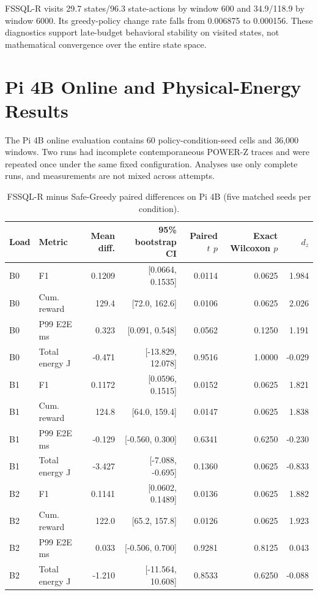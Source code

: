 \documentclass[10pt,journal]{IEEEtran}
\begin{document}
FSSQL-R visits 29.7 states/96.3 state-actions by window 600 and 34.9/118.9 by window 6000. Its greedy-policy change rate falls from 0.006875 to 0.000156. These diagnostics support late-budget behavioral stability on visited states, not mathematical convergence over the entire state space.

\section{Pi 4B Online and Physical-Energy Results}
The Pi 4B online evaluation contains 60 policy-condition-seed cells and 36,000 windows. Two runs had incomplete contemporaneous POWER-Z traces and were repeated once under the same fixed configuration. Analyses use only complete runs, and measurements are not mixed across attempts.

\begin{table}[h]
\caption{FSSQL-R minus Safe-Greedy paired differences on Pi 4B (five matched seeds per condition).}
\centering\scriptsize
\setlength{\tabcolsep}{3pt}
\begin{tabular}{llrrrrr}
\toprule
Load & Metric & Mean diff. & 95\% bootstrap CI & Paired $t$ $p$ & Exact Wilcoxon $p$ & $d_z$ \\
\midrule
B0 & F1 & 0.1209 & [0.0664, 0.1535] & 0.0114 & 0.0625 & 1.984 \\
B0 & Cum. reward & 129.4 & [72.0, 162.6] & 0.0106 & 0.0625 & 2.026 \\
B0 & P99 E2E ms & 0.323 & [0.091, 0.548] & 0.0562 & 0.1250 & 1.191 \\
B0 & Total energy J & -0.471 & [-13.829, 12.078] & 0.9516 & 1.0000 & -0.029 \\
\midrule
B1 & F1 & 0.1172 & [0.0596, 0.1515] & 0.0152 & 0.0625 & 1.821 \\
B1 & Cum. reward & 124.8 & [64.0, 159.4] & 0.0147 & 0.0625 & 1.838 \\
B1 & P99 E2E ms & -0.129 & [-0.560, 0.300] & 0.6341 & 0.6250 & -0.230 \\
B1 & Total energy J & -3.427 & [-7.088, -0.695] & 0.1360 & 0.0625 & -0.833 \\
\midrule
B2 & F1 & 0.1141 & [0.0602, 0.1489] & 0.0136 & 0.0625 & 1.882 \\
B2 & Cum. reward & 122.0 & [65.2, 157.8] & 0.0126 & 0.0625 & 1.923 \\
B2 & P99 E2E ms & 0.033 & [-0.506, 0.700] & 0.9281 & 0.8125 & 0.043 \\
B2 & Total energy J & -1.210 & [-11.564, 10.608] & 0.8533 & 0.6250 & -0.088 \\
\bottomrule
\end{tabular}
\end{table}
\end{document}

